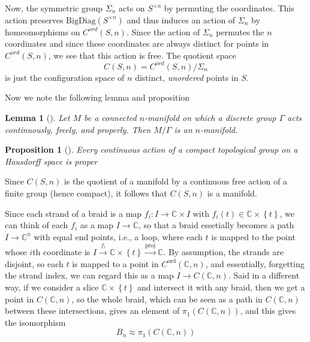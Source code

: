 \documentclass[reqno]{amsart}
\newtheorem{lemma}[theorem]{Lemma}
\newtheorem{proposition}[theorem]{Proposition}
\theoremstyle{definition}
\theoremstyle{remark}
\begin{document}
Now, the symmetric group $\Sigma_n$ acts on 
$S^{\times n}$ by permuting
the coordinates. This action preserves $\text{BigDiag}\left( 
 S^{\times n}\right) $ and thus induces an action
of $\Sigma_n$ by homeomorphisms on
$C^{ord}\left( S,n \right) $. Since the action of
$\Sigma_n$ permutes the $n$ coordinates and since
these coordinates are always distinct
for points in $C^{ord}\left( S,n \right) $, we see
that this action is free. The quotient space
\[
C \left( S,n \right) =
C^{ord}\left( S,n \right) / \Sigma_n
\] 
is just the configuration space of $n$ distinct,
\textit{unordered} points in $S$.


Now we note the following lemma \cite[Cor~12.27]{LeeTM}
and proposition \cite[Prop~12.22]{LeeTM}

\begin{lemma}[]
    Let $M$ be a connected $n$-manifold on which a discrete
    group $\Gamma$ acts continuously, freely, and properly.
    Then $M / \Gamma $ is an $n$-manifold.
\end{lemma}

\begin{proposition}[]
    Every continuous action of a compact topological group
    on a Hausdorff space is proper
\end{proposition}


Since $C\left( S,n \right) $ is the quotient of a
manifold by a continuous free action of a finite group (hence
compact),
it follows that $C\left( S,n \right) $ is a manifold.

Since each strand of a braid is a map
$f_i \colon I \to \mathbb{C} \times I$ with
$f_i(t) \in \mathbb{C} \times \left\{ t \right\} $, we can
think of each $f_i$ as a map
$I \to \mathbb{C}$, so that
a braid essetially becomes a path
$I \to \mathbb{C}^{n}$ with equal end points, i.e., a loop, where
each $t$ is mapped to the point
whose $i$th coordinate is $I \stackrel{f_i}{\to} \mathbb{C} 
\times \left\{ t \right\} \stackrel{\text{proj}}{\to }
\mathbb{C}
$. By assumption, the strands are disjoint, so
each  $t$ is mapped to a point in
$C^{\text{ord}}\left( \mathbb{C},n \right) $,
and essentially, forgetting
the strand index, we can regard this as a map
$I \to C \left( \mathbb{C}, n \right) $. Said in a different
way, if we consider a slice $\mathbb{C} \times \left\{ t \right\} $
and intersect it with any braid, then we get a point
in $C \left( \mathbb{C},n \right) $, so the whole braid,
which can be seen as a path in $C \left( \mathbb{C},n \right) $ 
between these intersections, gives an element
of $\pi_1 \left( C \left( \mathbb{C},n \right)  \right) $, and
this
gives the isomorphism
\[
B_n \approx \pi_1 \left( C \left( \mathbb{C}, n \right)  \right) 
\] 
\end{document}
